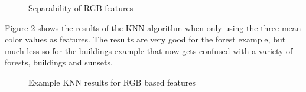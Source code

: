\begin{figure}[!hbt]
\centering
{}
\caption{Separability of RGB features}
\label{fig:mrgb}
\end{figure}

Figure \ref{fig:000001} shows the results of the KNN algorithm when only using the three mean color values as features. The results are very good for the forest example, but much less so for the buildings example that now gets confused with a variety of forests, buildings and sunsets.
\begin{figure}[!hbt]
\centering
{}
\caption{Example KNN results for RGB based features}
\label{fig:000001}
\end{figure}


